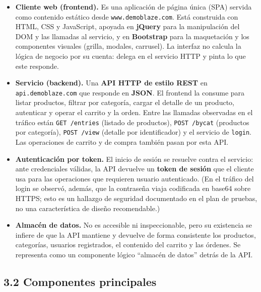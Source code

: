 \begin{itemize}
  \item \textbf{Cliente web (frontend).} Es una aplicación de página única (SPA)
        servida como contenido estático desde \texttt{www.demoblaze.com}. Está
        construida con HTML, CSS y JavaScript, apoyada en \textbf{jQuery} para la
        manipulación del DOM y las llamadas al servicio, y en \textbf{Bootstrap} para
        la maquetación y los componentes visuales (grilla, modales, carrusel). La
        interfaz no calcula la lógica de negocio por su cuenta: delega en el servicio
        HTTP y pinta lo que este responde.
  \item \textbf{Servicio (backend).} Una \textbf{API HTTP de estilo REST} en
        \texttt{api.demoblaze.com} que responde en \textbf{JSON}. El frontend la
        consume para listar productos, filtrar por categoría, cargar el detalle de un
        producto, autenticar y operar el carrito y la orden. Entre las llamadas
        observadas en el tráfico están \texttt{GET /entries} (listado de productos),
        \texttt{POST /bycat} (productos por categoría), \texttt{POST /view} (detalle
        por identificador) y el servicio de \texttt{login}. Las operaciones de carrito
        y de compra también pasan por esta API.
  \item \textbf{Autenticación por token.} El inicio de sesión se resuelve contra el
        servicio: ante credenciales válidas, la API devuelve un \textbf{token de
        sesión} que el cliente usa para las operaciones que requieren usuario
        autenticado. (En el tráfico del login se observó, además, que la contraseña
        viaja codificada en base64 sobre HTTPS; esto es un hallazgo de seguridad
        documentado en el plan de pruebas, no una característica de diseño
        recomendable.)
  \item \textbf{Almacén de datos.} No es accesible ni inspeccionable, pero su
        existencia se infiere de que la API mantiene y devuelve de forma consistente
        los productos, categorías, usuarios registrados, el contenido del carrito y
        las órdenes. Se representa como un componente lógico ``almacén de datos''
        detrás de la API.
\end{itemize}

\subsection*{3.2 Componentes principales}

